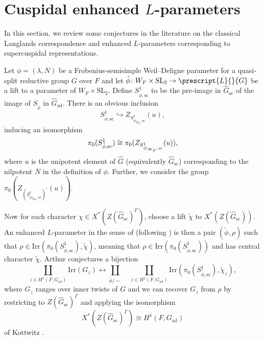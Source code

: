 \documentclass{amsart}
\theoremstyle{definition}
\theoremstyle{remark}
\numberwithin{equation}{section}
\newcommand{\Sc}{\mathrm{sc}}
\newcommand{\ad}{\mathrm{ad}}
\newcommand{\SL}{\mathrm{SL}}
\newcommand{\Irr}{\mathrm{Irr}}
\newcommand{\co}[1]{\prescript{#1}{}}
\newcommand{\wh}{\widehat}
\begin{document}
\section{Cuspidal enhanced \texorpdfstring{$L$}{L}-parameters}{\label{s: amscomparison}}
In this section, we review some conjectures in the literature on the classical Langlands correspondence and enhanced $L$-parameters corresponding to supercuspidal representations.

Let $\phi=(\lambda, N)$ be a Frobenius-semisimple Weil--Deligne parameter for a quasi-split reductive group $G$ over $F$ and let $\tilde{\phi}\colon W_F \times \SL_2 \rightarrow \co{L}{G}$ be a lift to a parameter of $W_F \times \SL_2$.  Define $S^1_{\tilde{\phi}, \Sc}$ to be the pre-image in $\wh{G}_{\Sc}$ of the image of $S_{\tilde{\phi}}$ in $\wh{G}_{\ad}$. There is an obvious inclusion
\begin{equation*}
    S^1_{\tilde{\phi}, \Sc} \hookrightarrow Z_{S^1_{\tilde{\phi}|_{W_F}, \Sc}}(u),
\end{equation*}
inducing an isomorphism
\begin{equation}{\label{eqn: AMScomponentgroupiso}}
    \pi_0(S^1_{\tilde{\phi}, \Sc}) \cong \pi_0(Z_{S^1_{\tilde{\phi}|_{W_F}, \Sc}}(u)),
\end{equation}
where $u$ is the unipotent element of $\wh{G}$ (equivalently $\wh{G}_{\Sc}$) corresponding to the nilpotent $N$ in the definition of $\phi$. Further, we consider the group $\pi_0(Z_{(S^1_{\tilde{\phi}|_{W_F}, \Sc})^{\circ}}(u))$.

Now for each character $\chi \in X^{\ast}(Z(\wh{G}_{\Sc})^{\Gamma})$, choose a lift $\tilde{\chi}$ to $X^{\ast}(Z(\wh{G}_{\Sc}))$. An enhanced $L$-parameter in the sense of \cite{AMS1} (following \cite{ArthurLpacketnote}) is then a pair $(\tilde{\phi}, \rho)$ such that $\rho \in \Irr(\pi_0(S^1_{\tilde{\phi}, \Sc}), \tilde{\chi})$, meaning that $\rho \in \Irr(\pi_0(S^1_{\tilde{\phi}, \Sc}))$ and has central character $\tilde{\chi}$. Arthur conjectures a bijection
\begin{equation*}
    \coprod\limits_{z \in H^1(F, G_{\ad})} \Irr(G_z) \longleftrightarrow \coprod\limits_{\tilde{\phi} / \sim } \quad  \coprod\limits_{z \in H^1(F, G_{\ad})} \Irr(\pi_0(S^1_{\tilde{\phi}, \Sc}), \tilde{\chi}_z),
\end{equation*}
where $G_z$ ranges over inner twists of $G$ and we can recover $G_z$ from $\rho$ by restricting to $Z(\wh{G}_{\Sc})^{\Gamma}$ and applying the isomorphism
\begin{equation*}
    X^{\ast}(Z(\wh{G}_{\Sc})^{\Gamma}) \cong H^1(F, G_{\ad})
\end{equation*}
of Kottwitz \cite[Proposition 6.4]{Kot5}.
\end{document}

